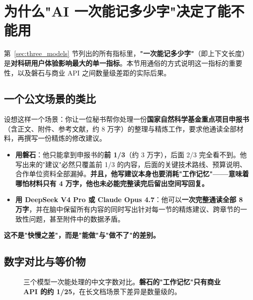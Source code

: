 \section{为什么"AI 一次能记多少字"决定了能不能用}
\label{sec:context}

第~\ref{sec:three_models} 节列出的所有指标里，\textbf{"一次能记多少字"}（即上下文长度）是\textbf{对科研用户体验影响最大的单一指标}。本节用通俗的方式说明这一指标的重要性，以及磐石与商业 API 之间数量级差距的实际后果。

\subsection{一个公文场景的类比}

设想这样一个场景：你让一位秘书帮你处理一份\textbf{国家自然科学基金重点项目申报书}（含正文、附件、参考文献，约 8 万字）的整理与精炼工作，要求他通读全部材料，再撰写一份精炼的修改建议。

\begin{itemize}
\item \textbf{用磐石}：他只能拿到申报书的\textbf{前 1/3}（约 3 万字），后面 2/3 完全看不到。他写出来的"建议"必然只覆盖前 1/3 的内容，后面的关键技术路线、预算说明、合作单位资料全部漏掉。\textbf{并且，他写建议本身也要消耗"工作记忆"——意味着哪怕材料只有 4 万字，他也未必能完整读完后留出空间写回复。}

\item \textbf{用 DeepSeek V4 Pro 或 Claude Opus 4.7}：他可以\textbf{一次完整通读全部 8 万字}，并在脑中保留所有内容的同时写出针对每一节的精炼建议、跨章节的一致性问题，甚至附件中的数据矛盾。
\end{itemize}

\textbf{这不是"快慢之差"，而是"能做"与"做不了"的差别。}

\subsection{数字对比与等价物}

\begin{figure}[h]
\centering
{}
\caption{三个模型一次能处理的中文字数对比。\textbf{磐石的"工作记忆"只有商业 API 的约 1/25}，在长文档场景下差异是数量级的。}
\end{figure}


